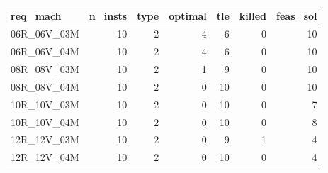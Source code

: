 
\begin{tabular}{lrrrrrr}
\toprule
req\_mach & n\_insts & type & optimal & tle & killed & feas\_sol\\
\midrule
06R\_06V\_03M & 10 & 2 & 4 & 6 & 0 & 10\\
06R\_06V\_04M & 10 & 2 & 4 & 6 & 0 & 10\\
08R\_08V\_03M & 10 & 2 & 1 & 9 & 0 & 10\\
08R\_08V\_04M & 10 & 2 & 0 & 10 & 0 & 10\\
10R\_10V\_03M & 10 & 2 & 0 & 10 & 0 & 7\\
\addlinespace
10R\_10V\_04M & 10 & 2 & 0 & 10 & 0 & 8\\
12R\_12V\_03M & 10 & 2 & 0 & 9 & 1 & 4\\
12R\_12V\_04M & 10 & 2 & 0 & 10 & 0 & 4\\
\bottomrule
\end{tabular}
